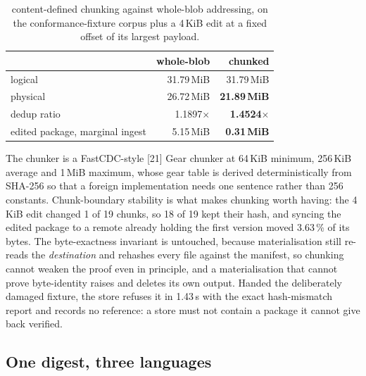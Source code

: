 \documentclass[10pt,twocolumn,letterpaper]{article}
\begin{document}
\begin{table}[t]\centering\footnotesize
\caption{content-defined chunking against whole-blob addressing, on the conformance-fixture corpus plus a 4\,KiB edit at a fixed offset of its largest payload.}
\begin{tabular}{@{}L{3.3cm} r r@{}}
\toprule
 & whole-blob & chunked \\
\midrule
logical & 31.79\,MiB & 31.79\,MiB \\
physical & 26.72\,MiB & \textbf{21.89\,MiB} \\
dedup ratio & 1.1897$\times$ & \textbf{1.4524$\times$} \\
edited package, marginal ingest & 5.15\,MiB & \textbf{0.31\,MiB} \\
\bottomrule
\end{tabular}
\end{table}

The chunker is a FastCDC-style [21] Gear chunker at 64\,KiB minimum, 256\,KiB average and 1\,MiB maximum, whose gear table is derived deterministically from SHA-256 so that a foreign implementation needs one sentence rather than 256 constants. Chunk-boundary stability is what makes chunking worth having: the 4\,KiB edit changed 1 of 19 chunks, so 18 of 19 kept their hash, and syncing the edited package to a remote already holding the first version moved 3.63\,\% of its bytes. The byte-exactness invariant is untouched, because materialisation still re-reads the \emph{destination} and rehashes every file against the manifest, so chunking cannot weaken the proof even in principle, and a materialisation that cannot prove byte-identity raises and deletes its own output. Handed the deliberately damaged fixture, the store refuses it in 1.43\,s with the exact hash-mismatch report and records no reference: a store must not contain a package it cannot give back verified.

\subsection{One digest, three languages}
\end{document}
